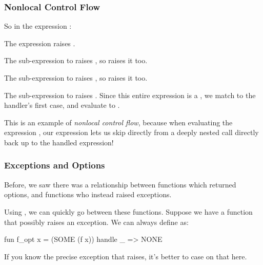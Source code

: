 \documentclass[aspectratio=169]{beamer}
\begin{document}
\begin{frame}[fragile]
  \frametitle{Nonlocal Control Flow}

  So in the expression : 
  
  \vspace{\fill}

  The expression  raises . 

  \vspace{3pt}

  The sub-expression  to  raises ,
  so  raises it too. 
  
  \vspace{3pt}

  The sub-expression  to  raises 
  , so  raises it too. 

  \vspace{3pt}
  
  The sub-expression  to 
   raises . Since this
  entire expression is a , we match  to the
  handler's first case, and evaluate to .

  \vspace{\fill}

  This is an example of \textit{nonlocal control flow}, because when evaluating
  the expression , our  expression
  lets us skip directly from a deeply nested  call directly back up
  to the handled expression!
\end{frame}

\begin{frame}[fragile]
  \frametitle{Exceptions and Options}

  Before, we saw there was a relationship between functions which returned
  options, and functions who instead raised exceptions.

  \vspace{\fill}

  Using , we can quickly go between these functions. Suppose we
  have a function  that possibly raises an exception. We can
  always define  as:
  \begin{codeblock}
    fun f_opt x = (SOME (f x)) handle _ => NONE
  \end{codeblock}

  \vspace{\fill}


  \vspace{\fill}

  If you know the precise exception that  raises, it's better to case on
  that here.
\end{frame}
\end{document}
